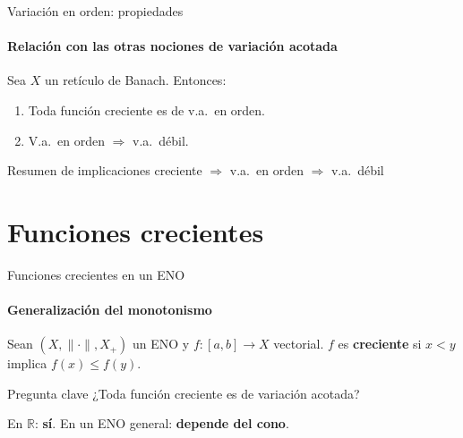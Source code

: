\documentclass{beamer}
\newcommand{\Xp}{X_{+}}               %
\begin{document}

\begin{frame}{Variación en orden: propiedades}
\framesubtitle{Relación con las otras nociones de variación acotada}

\begin{theorem}
Sea $X$ un retículo de Banach. Entonces:
\begin{enumerate}
    \item Toda función creciente es de v.a.\ en orden.
    \item V.a.\ en orden $\Rightarrow$ v.a.\ débil.
\end{enumerate}
\end{theorem}

\medskip

\begin{block}{Resumen de implicaciones}
\centering
creciente $\Rightarrow$ v.a.\ en orden $\Rightarrow$ v.a.\ débil
\end{block}


\end{frame}

\section{Funciones crecientes}


\begin{frame}{Funciones crecientes en un ENO}
\framesubtitle{Generalización del monotonismo}

\begin{definition}
Sean $(X,\|\cdot\|,\Xp)$ un ENO y $f:[a,b]\to X$ vectorial.
$f$ es \textbf{creciente} si $x < y$ implica $f(x)\le f(y)$.
\end{definition}

\medskip

\begin{alertblock}{Pregunta clave}
¿Toda función creciente es de variación acotada?

\smallskip
En $\mathbb{R}$: \textbf{sí}. En un ENO general: \textbf{depende del cono}.
\end{alertblock}


\end{frame}
\end{document}
